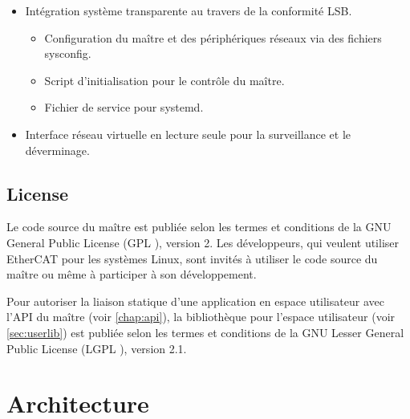 \documentclass[a4paper,12pt,BCOR=6mm,bibtotoc,idxtotoc]{scrbook}
\begin{document}
\begin{itemize}
\begin{itemize}
  \end{itemize}

\item Int\'egration syst\`eme transparente au travers de la
  conformit\'e LSB.

  \begin{itemize}

  \item Configuration du ma\^itre et des p\'eriph\'eriques r\'eseaux
    via des fichiers sysconfig.

  \item Script d'initialisation pour le contr\^ole du ma\^itre.

  \item Fichier de service pour systemd.

  \end{itemize}

\item Interface r\'eseau virtuelle en lecture seule pour la surveillance et le d\'everminage.

\end{itemize}


\section{License}
\label{sec:license}

Le code source du ma\^itre est publi\'ee selon les termes et
conditions de la GNU General Public License (GPL
\cite{gpl}), version 2. Les d\'eveloppeurs, qui veulent
utiliser EtherCAT pour les syst\`emes Linux, sont invit\'es \`a
utiliser le code source du ma\^itre ou m\^eme \`a participer \`a son
d\'eveloppement.

Pour autoriser la liaison statique d'une application en espace
utilisateur avec l'API du ma\^itre (voir \autoref{chap:api}), la
biblioth\`eque pour l'espace utilisateur (voir \autoref{sec:userlib})
est publi\'ee selon les termes et conditions de la GNU Lesser General
Public License (LGPL \cite{lgpl}), version 2.1.


\chapter{Architecture}
\label{chap:arch}
\end{document}
